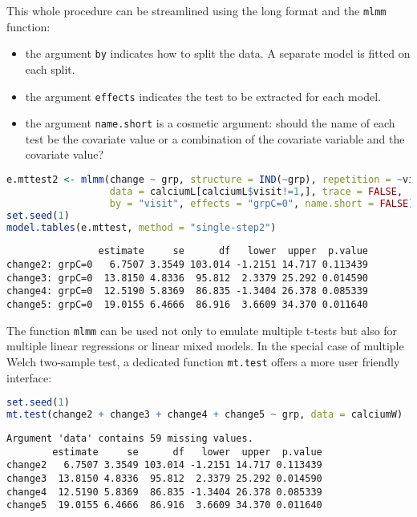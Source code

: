 \documentclass[12pt]{article}
\begin{document}
\bigskip

This whole procedure can be streamlined using the long format and the
\texttt{mlmm} function:
\begin{itemize}
\item the argument \texttt{by} indicates how to split the data. A separate model
is fitted on each split.
\item the argument \texttt{effects} indicates the test to be extracted for each
model.
\item the argument \texttt{name.short} is a cosmetic argument: should the name of
each test be the covariate value or a combination of the covariate
variable and the covariate value?
\end{itemize}
\begin{lstlisting}[language=r,numbers=none]
e.mttest2 <- mlmm(change ~ grp, structure = IND(~grp), repetition = ~visit|girl,
                  data = calciumL[calciumL$visit!=1,], trace = FALSE,
                  by = "visit", effects = "grpC=0", name.short = FALSE)
set.seed(1)
model.tables(e.mttest, method = "single-step2")
\end{lstlisting}



\label{}
\begin{verbatim}
                estimate     se      df   lower  upper  p.value
change2: grpC=0   6.7507 3.3549 103.014 -1.2151 14.717 0.113439
change3: grpC=0  13.8150 4.8336  95.812  2.3379 25.292 0.014590
change4: grpC=0  12.5190 5.8369  86.835 -1.3404 26.378 0.085339
change5: grpC=0  19.0155 6.4666  86.916  3.6609 34.370 0.011640
\end{verbatim}


The function \texttt{mlmm} can be used not only to emulate multiple t-tests
but also for multiple linear regressions or linear mixed models. In
the special case of multiple Welch two-sample test, a dedicated
function \texttt{mt.test} offers a more user friendly interface:
\begin{lstlisting}[language=r,numbers=none]
set.seed(1)
mt.test(change2 + change3 + change4 + change5 ~ grp, data = calciumW)
\end{lstlisting}

\label{}
\begin{verbatim}
Argument 'data' contains 59 missing values. 
        estimate     se      df   lower  upper  p.value
change2   6.7507 3.3549 103.014 -1.2151 14.717 0.113439
change3  13.8150 4.8336  95.812  2.3379 25.292 0.014590
change4  12.5190 5.8369  86.835 -1.3404 26.378 0.085339
change5  19.0155 6.4666  86.916  3.6609 34.370 0.011640
\end{verbatim}
\end{document}

